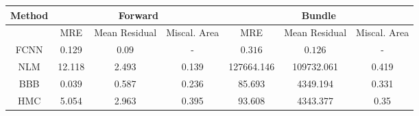 \documentclass[convert={outext=.png}]{standalone}
\begin{document}
\centering
\label{tab:experimental_results}



\begin{tabular}{c c c c c c c}
\hline
\hline
Method &  \multicolumn{3}{c}{Forward} & \multicolumn{3}{c}{Bundle} \\ \hline
 & MRE & Mean Residual & Miscal. Area & MRE & Mean Residual & Miscal. Area\\
 FCNN & 0.129 & $\mathbf{0.09}$ & - & $\mathbf{0.316}$ & $\mathbf{0.126}$ & - \\
 \hline
 NLM & 12.118 & 2.493 & 0.139 & 127664.146 & 109732.061 & 0.419 \\
 BBB & $\mathbf{0.039}$ & 0.587 & 0.236 & 85.693 & 4349.194 & 0.331 \\
 HMC & 5.054 & 2.963 & 0.395 & 93.608 & 4343.377 & 0.35 \\
\hline
\hline
\end{tabular}
\end{document}
